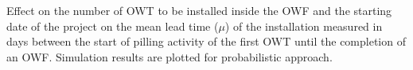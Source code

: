 \label{fig:effectnumber}
Effect on the number of OWT to be installed inside the OWF and the starting date of the project on the mean lead time ($\mu$) of the installation measured in days between the start of pilling activity of the first OWT until the completion of an OWF. Simulation results are plotted for probabilistic approach.
